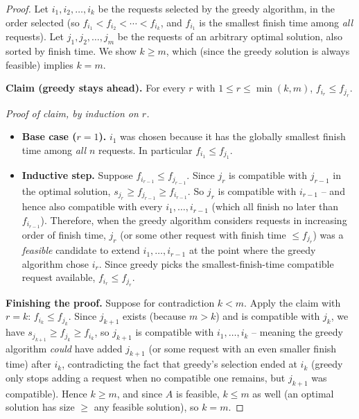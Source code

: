 \documentclass[11pt]{article}
\begin{document}
\begin{proof}
Let $i_1, i_2, \ldots, i_k$ be the requests selected by the greedy algorithm, in the order
selected (so $f_{i_1} < f_{i_2} < \cdots < f_{i_k}$, and $f_{i_1}$ is the smallest finish
time among \emph{all} requests). Let $j_1, j_2, \ldots, j_m$ be the requests of an
arbitrary optimal solution, also sorted by finish time. We show $k \ge m$, which (since
the greedy solution is always feasible) implies $k = m$.

\textbf{Claim (greedy stays ahead).} For every $r$ with $1 \le r \le \min(k,m)$,
$f_{i_r} \le f_{j_r}$.

\textit{Proof of claim, by induction on $r$.}
\begin{itemize}
    \item \textbf{Base case ($r=1$).} $i_1$ was chosen because it has the globally
    smallest finish time among \emph{all} $n$ requests. In particular $f_{i_1} \le
    f_{j_1}$.
    \item \textbf{Inductive step.} Suppose $f_{i_{r-1}} \le f_{j_{r-1}}$. Since $j_r$ is
    compatible with $j_{r-1}$ in the optimal solution, $s_{j_r} \ge f_{j_{r-1}} \ge
    f_{i_{r-1}}$. So $j_r$ is compatible with $i_{r-1}$ -- and hence also compatible with
    every $i_1, \ldots, i_{r-1}$ (which all finish no later than $f_{i_{r-1}}$).
    Therefore, when the greedy algorithm considers requests in increasing order of finish
    time, $j_r$ (or some other request with finish time $\le f_{j_r}$) was a
    \emph{feasible} candidate to extend $i_1, \ldots, i_{r-1}$ at the point where the
    greedy algorithm chose $i_r$. Since greedy picks the smallest-finish-time compatible
    request available, $f_{i_r} \le f_{j_r}$.
\end{itemize}

\textbf{Finishing the proof.} Suppose for contradiction $k < m$. Apply the claim with $r =
k$: $f_{i_k} \le f_{j_k}$. Since $j_{k+1}$ exists (because $m > k$) and is compatible with
$j_k$, we have $s_{j_{k+1}} \ge f_{j_k} \ge f_{i_k}$, so $j_{k+1}$ is compatible with
$i_1,\ldots,i_k$ -- meaning the greedy algorithm \emph{could} have added $j_{k+1}$ (or
some request with an even smaller finish time) after $i_k$, contradicting the fact that
greedy's selection ended at $i_k$ (greedy only stops adding a request when no compatible
one remains, but $j_{k+1}$ was compatible). Hence $k \ge m$, and since $A$ is feasible,
$k \le m$ as well (an optimal solution has size $\ge$ any feasible solution), so $k = m$.
\end{proof}
\end{document}
